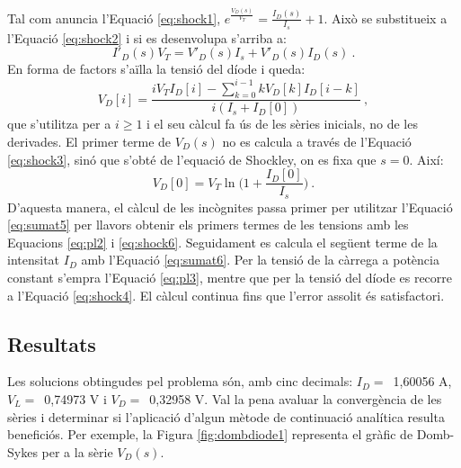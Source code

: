 Tal com anuncia l'Equació \ref{eq:shock1}, $e^{\frac{V_D(s)}{V_T}}=\frac{I_D(s)}{I_s}+1$. Això se substitueix a l'Equació \ref{eq:shock2} i si es desenvolupa s'arriba a:
\begin{equation}
    I'_D(s)V_T=V'_D(s)I_s+V'_D(s)I_D(s)\ .
    \label{eq:shock3}
\end{equation}
En forma de factors s'aïlla la tensió del díode i queda:
\begin{equation}
    V_D[i]=\frac{iV_TI_D[i]-\sum_{k=0}^{i-1}kV_D[k]I_D[i-k]}{i(I_s+I_D[0])}\ ,
    \label{eq:shock4}
\end{equation}
que s'utilitza per a $i\geq 1$ i el seu càlcul fa ús de les sèries inicials, no de les derivades. El primer terme de $V_D(s)$ no es calcula a través de l'Equació \ref{eq:shock3}, sinó que s'obté de l'equació de Shockley, on es fixa que $s=0$. Així:
\begin{equation}
    V_D[0]=V_T\ln\biggl(1+\frac{I_D[0]}{I_s}\biggr)\ .
    \label{eq:shock6}
\end{equation}
D'aquesta manera, el càlcul de les incògnites passa primer per utilitzar l'Equació \ref{eq:sumat5} per llavors obtenir els primers termes de les tensions amb les Equacions \ref{eq:pl2} i \ref{eq:shock6}. Seguidament es calcula el següent terme de la intensitat $I_D$ amb l'Equació \ref{eq:sumat6}. Per la tensió de la càrrega a potència constant s'empra l'Equació \ref{eq:pl3}, mentre que per la tensió del díode es recorre a l'Equació \ref{eq:shock4}. El càlcul continua fins que l'error assolit és satisfactori.

\subsection{Resultats}
Les solucions obtingudes pel problema són, amb cinc decimals: $I_D=$\ 1,60056 A, $V_L=$\ 0,74973 V i $V_D=$\ 0,32958 V. Val la pena avaluar la convergència de les sèries i determinar si l'aplicació d'algun mètode de continuació analítica resulta beneficiós. Per exemple, la Figura \ref{fig:dombdiode1} representa el gràfic de Domb-Sykes per a la sèrie $V_D(s)$.

